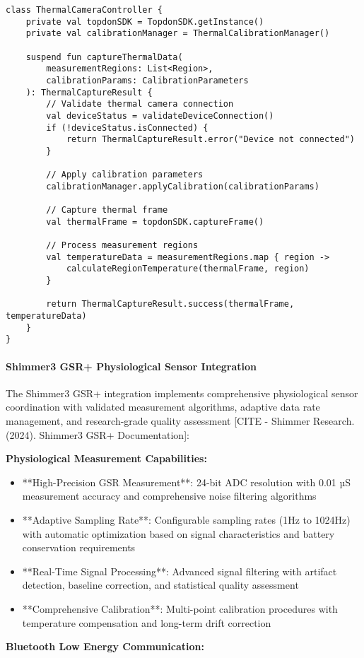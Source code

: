 \documentclass[12pt,a4paper]{report}
\begin{document}
\begin{verbatim}
class ThermalCameraController {
    private val topdonSDK = TopdonSDK.getInstance()
    private val calibrationManager = ThermalCalibrationManager()

    suspend fun captureThermalData(
        measurementRegions: List<Region>,
        calibrationParams: CalibrationParameters
    ): ThermalCaptureResult {
        // Validate thermal camera connection
        val deviceStatus = validateDeviceConnection()
        if (!deviceStatus.isConnected) {
            return ThermalCaptureResult.error("Device not connected")
        }

        // Apply calibration parameters
        calibrationManager.applyCalibration(calibrationParams)

        // Capture thermal frame
        val thermalFrame = topdonSDK.captureFrame()

        // Process measurement regions
        val temperatureData = measurementRegions.map { region ->
            calculateRegionTemperature(thermalFrame, region)
        }

        return ThermalCaptureResult.success(thermalFrame, temperatureData)
    }
}
\end{verbatim}

\paragraph{Shimmer3 GSR+ Physiological Sensor Integration}

The Shimmer3 GSR+ integration implements comprehensive physiological sensor coordination with validated measurement
algorithms, adaptive data rate management, and research-grade quality
assessment [CITE - Shimmer Research. (2024). Shimmer3 GSR+ Documentation]:

\textbf{Physiological Measurement Capabilities:}

\begin{itemize}
\item **High-Precision GSR Measurement**: 24-bit ADC resolution with 0.01 µS measurement accuracy and comprehensive noise
  filtering algorithms
\item **Adaptive Sampling Rate**: Configurable sampling rates (1Hz to 1024Hz) with automatic optimization based on signal
  characteristics and battery conservation requirements
\item **Real-Time Signal Processing**: Advanced signal filtering with artifact detection, baseline correction, and
  statistical quality assessment
\item **Comprehensive Calibration**: Multi-point calibration procedures with temperature compensation and long-term drift
  correction

\end{itemize}
\textbf{Bluetooth Low Energy Communication:}
\end{document}
